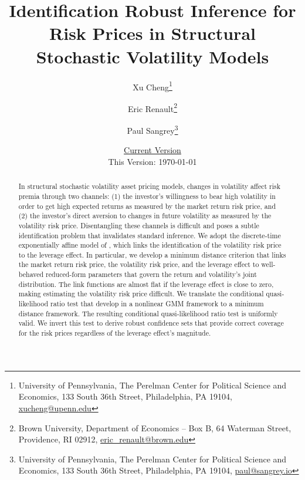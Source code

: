 \documentclass[11pt, letterpaper, twoside]{article}
\author{Xu Cheng\thanks{University of Pennsylvania, The Perelman Center for Political Science and Economics, 133 South 36th Street, Philadelphia, PA 19104, \href{mailto:xucheng@upenn.edu}{xucheng@upenn.edu}} \and Eric Renault\thanks{Brown University, Department of Economics -- Box B, 64 Waterman Street, Providence, RI 02912, \href{mailto:eric_renault@brown.edu}{eric\_renault@brown.edu}} \and Paul Sangrey\thanks{University of Pennsylvania, The Perelman Center for Political Science and Economics, 133 South 36th Street, Philadelphia, PA 19104, \href{mailto:paul@sangrey.io}{paul@sangrey.io}}}
\title{Identification Robust Inference for Risk Prices in Structural Stochastic Volatility Models}
\date{\href{http://sangrey.io/risk_price_inference.pdf}{Current Version} \protect\\ This Version: \today}
\begin{document}
\begin{titlepage}


\maketitle
\thispagestyle{empty}
\addtocounter{page}{-1}

\begin{abstract} 

\singlespacing \noindent 
In structural stochastic volatility asset pricing models, changes in volatility affect risk premia through two channels: (1) the investor's willingness to bear high volatility in order to get high expected returns as measured by the market return risk price, and (2) the investor’s direct aversion to changes in future volatility as measured by the volatility risk price. Disentangling these channels is difficult and poses a subtle identification problem that invalidates standard inference. We adopt the discrete-time exponentially affine model of \textcite{han2018leverage}, which links the identification of the volatility risk price to the leverage effect. In particular, we develop a minimum distance criterion that links the market return risk price, the volatility risk price, and the leverage effect to well-behaved reduced-form parameters that govern the return and volatility's joint distribution. The link functions are almost flat if the leverage effect is close to zero, making estimating the volatility risk price difficult. We translate the conditional quasi-likelihood ratio test that \textcite{andrews2016conditional} develop in a nonlinear GMM framework to a minimum distance framework. The resulting conditional quasi-likelihood ratio test is uniformly valid. We invert this test to derive robust confidence sets that provide correct coverage for the risk prices regardless of the leverage effect's magnitude. 
%
\end{abstract} 

\medskip
{}

\medskip


\end{titlepage}

\clearpage


\printbibliography[heading=bibintoc]

\begin{appendices}
    

\end{appendices}
\end{document}
